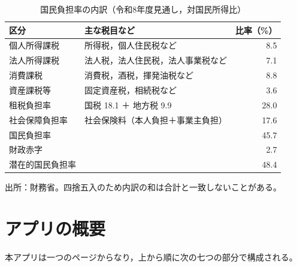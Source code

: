 \documentclass[paper=a4,fontsize=10pt]{jlreq}
\begin{document}
\begin{table}[htbp]
  \centering
  \caption{国民負担率の内訳（令和8年度見通し，対国民所得比）}\label{tab:breakdown}
  \begin{tabular}{llr}
    \toprule
    区分 & 主な税目など & 比率（\%）\\
    \midrule
    個人所得課税 & 所得税，個人住民税など & 8.5 \\
    法人所得課税 & 法人税，法人住民税，法人事業税など & 7.1 \\
    消費課税 & 消費税，酒税，揮発油税など & 8.8 \\
    資産課税等 & 固定資産税，相続税など & 3.6 \\
    \midrule
    租税負担率 & 国税 18.1 ＋ 地方税 9.9 & 28.0 \\
    社会保障負担率 & 社会保険料（本人負担＋事業主負担） & 17.6 \\
    \midrule
    国民負担率 & & 45.7 \\
    財政赤字 & & 2.7 \\
    潜在的国民負担率 & & 48.4 \\
    \bottomrule
  \end{tabular}

  \smallskip
  {\footnotesize 出所：財務省\cite{mof2026,mofa04}。四捨五入のため内訳の和は合計と一致しないことがある。}
\end{table}

\section{アプリの概要}\label{sec:app}

本アプリは一つのページからなり，上から順に次の七つの部分で構成される。
\end{document}
